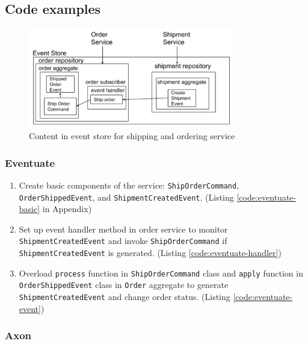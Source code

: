 \subsection{Code examples}

\begin{figure}[H]
    \centering
    \includegraphics[width=9cm]{assets/README-d8970.png}
    \nocaptionrule \caption{\label{fig:code-example} Content in event store for shipping and ordering service}
\end{figure}

\subsubsection{Eventuate}
\begin{enumerate}[i]
    \item Create basic components of the service: \texttt{ShipOrderCommand}, \texttt{OrderShippedEvent}, and \texttt{ShipmentCreated\-Event}. (Listing \ref{code:eventuate-basic} in Appendix)
    \item Set up event handler method in order service to monitor \texttt{ShipmentCreatedEvent} and invoke \texttt{ShipOrder\-Command} if \texttt{ShipmentCreatedEvent} is generated. (Listing \ref{code:eventuate-handler})
    
    \item Overload \texttt{process} function in \texttt{ShipOrderCommand} class and \texttt{apply} function in \texttt{OrderShippedEvent} class in \texttt{Order} aggregate to generate \texttt{ShipmentCreatedEvent} and change order status. (Listing \ref{code:eventuate-event})
    
\end{enumerate}

\subsubsection{Axon}

